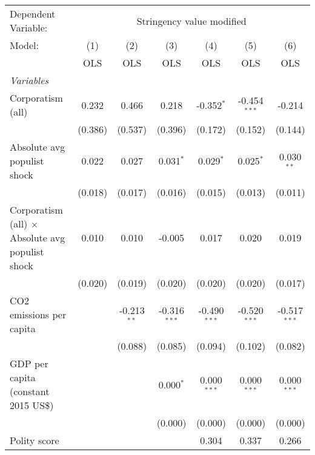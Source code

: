 
\begingroup
\centering
\begin{tabular}{lcccccc}
   \toprule
   Dependent Variable: & \multicolumn{6}{c}{Stringency value modified}\\
   Model:                                                  & (1)     & (2)           & (3)            & (4)            & (5)            & (6)\\  
                                                           &  OLS    & OLS           & OLS            & OLS            & OLS            & OLS\\  
   \midrule
   \emph{Variables}\\
   Corporatism (all)                                       & 0.232   & 0.466         & 0.218          & -0.352$^{*}$   & -0.454$^{***}$ & -0.214\\   
                                                           & (0.386) & (0.537)       & (0.396)        & (0.172)        & (0.152)        & (0.144)\\   
   Absolute avg populist shock                             & 0.022   & 0.027         & 0.031$^{*}$    & 0.029$^{*}$    & 0.025$^{*}$    & 0.030$^{**}$\\   
                                                           & (0.018) & (0.017)       & (0.016)        & (0.015)        & (0.013)        & (0.011)\\   
   Corporatism (all) $\times$ Absolute avg populist shock  & 0.010   & 0.010         & -0.005         & 0.017          & 0.020          & 0.019\\   
                                                           & (0.020) & (0.019)       & (0.020)        & (0.020)        & (0.020)        & (0.017)\\   
   CO2 emissions per capita                                &         & -0.213$^{**}$ & -0.316$^{***}$ & -0.490$^{***}$ & -0.520$^{***}$ & -0.517$^{***}$\\   
                                                           &         & (0.088)       & (0.085)        & (0.094)        & (0.102)        & (0.082)\\   
   GDP per capita (constant 2015 US\$)                     &         &               & 0.000$^{*}$    & 0.000$^{***}$  & 0.000$^{***}$  & 0.000$^{***}$\\   
                                                           &         &               & (0.000)        & (0.000)        & (0.000)        & (0.000)\\   
   Polity score                                            &         &               &                & 0.304          & 0.337          & 0.266\\   

\end{tabular}
